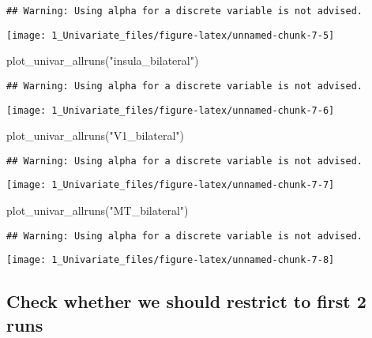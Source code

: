 \documentclass[
]{article}
\newenvironment{Shaded}{\begin{snugshade}}{\end{snugshade}}
\newcommand{\FunctionTok}[1]{\textcolor[rgb]{0.00,0.00,0.00}{#1}}
\newcommand{\NormalTok}[1]{#1}
\newcommand{\StringTok}[1]{\textcolor[rgb]{0.31,0.60,0.02}{#1}}
\begin{document}
\begin{verbatim}
## Warning: Using alpha for a discrete variable is not advised.
\end{verbatim}

\texttt{[image: 1\_Univariate\_files/figure-latex/unnamed-chunk-7-5]}

\begin{Shaded}
\begin{Highlighting}[]
\FunctionTok{plot\_univar\_allruns}\NormalTok{(}\StringTok{"insula\_bilateral"}\NormalTok{)}
\end{Highlighting}
\end{Shaded}

\begin{verbatim}
## Warning: Using alpha for a discrete variable is not advised.
\end{verbatim}

\texttt{[image: 1\_Univariate\_files/figure-latex/unnamed-chunk-7-6]}

\begin{Shaded}
\begin{Highlighting}[]
\FunctionTok{plot\_univar\_allruns}\NormalTok{(}\StringTok{"V1\_bilateral"}\NormalTok{)}
\end{Highlighting}
\end{Shaded}

\begin{verbatim}
## Warning: Using alpha for a discrete variable is not advised.
\end{verbatim}

\texttt{[image: 1\_Univariate\_files/figure-latex/unnamed-chunk-7-7]}

\begin{Shaded}
\begin{Highlighting}[]
\FunctionTok{plot\_univar\_allruns}\NormalTok{(}\StringTok{"MT\_bilateral"}\NormalTok{)}
\end{Highlighting}
\end{Shaded}

\begin{verbatim}
## Warning: Using alpha for a discrete variable is not advised.
\end{verbatim}

\texttt{[image: 1\_Univariate\_files/figure-latex/unnamed-chunk-7-8]}

\hypertarget{check-whether-we-should-restrict-to-first-2-runs}{%
\subsection{Check whether we should restrict to first 2
runs}\label{check-whether-we-should-restrict-to-first-2-runs}}
\end{document}
